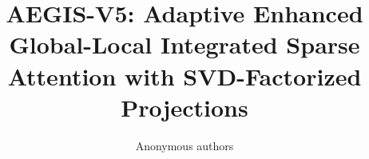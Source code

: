 \title{\textbf{AEGIS-V5: Adaptive Enhanced Global-Local Integrated Sparse Attention with SVD-Factorized Projections}}

\author{Anonymous authors}
